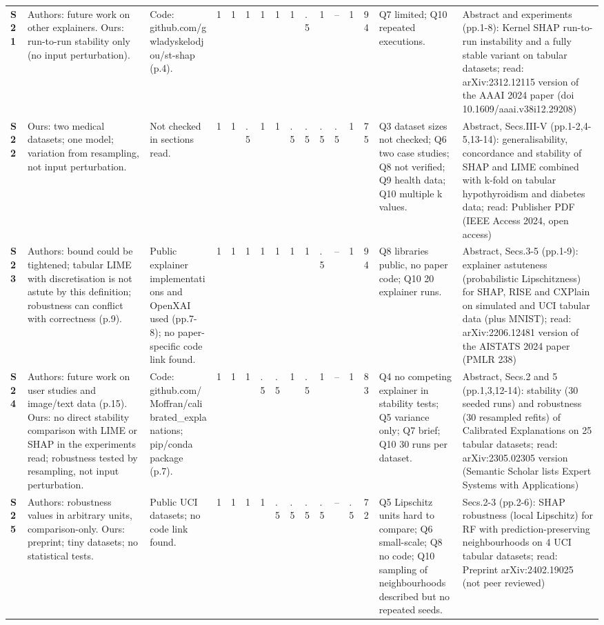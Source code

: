 \begin{longtable}{@{}P{1.0cm}P{4.6cm}P{3.6cm}P{0.3cm}P{0.3cm}P{0.3cm}P{0.3cm}P{0.3cm}P{0.3cm}P{0.3cm}P{0.3cm}P{0.3cm}P{0.36cm}P{0.75cm}P{3.0cm}P{3.9cm}@{}}
\textbf{S21} & Authors: future work on other explainers. Ours: run-to-run stability only (no input perturbation). & Code: github.com/\allowbreak{}gwladyskelodjou/\allowbreak{}st-shap (p.4). & 1 & 1 & 1 & 1 & 1 & 1 & .5 & 1 & -- & 1 & 94 & Q7 limited; Q10 repeated executions. & Abstract and experiments (pp.1-8): Kernel SHAP run-to-run instability and a fully stable variant on tabular datasets; read: arXiv:2312.12115 version of the AAAI 2024 paper (doi 10.1609/\allowbreak{}aaai.v38i12.29208) \\
\textbf{S22} & Ours: two medical datasets; one model; variation from resampling, not input perturbation. & Not checked in sections read. & 1 & 1 & .5 & 1 & 1 & .5 & .5 & .5 & .5 & 1 & 75 & Q3 dataset sizes not checked; Q6 two case studies; Q8 not verified; Q9 health data; Q10 multiple k values. & Abstract, Secs.III-V (pp.1-2,4-5,13-14): generalisability, concordance and stability of SHAP and LIME combined with k-fold on tabular hypothyroidism and diabetes data; read: Publisher PDF (IEEE Access 2024, open access) \\
\textbf{S23} & Authors: bound could be tightened; tabular LIME with discretisation is not astute by this definition; robustness can conflict with correctness (p.9). & Public explainer implementations and OpenXAI used (pp.7-8); no paper-specific code link found. & 1 & 1 & 1 & 1 & 1 & 1 & 1 & .5 & -- & 1 & 94 & Q8 libraries public, no paper code; Q10 20 explainer runs. & Abstract, Secs.3-5 (pp.1-9): explainer astuteness (probabilistic Lipschitzness) for SHAP, RISE and CXPlain on simulated and UCI tabular data (plus MNIST); read: arXiv:2206.12481 version of the AISTATS 2024 paper (PMLR 238) \\
\textbf{S24} & Authors: future work on user studies and image/\allowbreak{}text data (p.15). Ours: no direct stability comparison with LIME or SHAP in the experiments read; robustness tested by resampling, not input perturbation. & Code: github.com/\allowbreak{}Moffran/\allowbreak{}calibrated\_\allowbreak{}explanations; pip/\allowbreak{}conda package (p.7). & 1 & 1 & 1 & .5 & .5 & 1 & .5 & 1 & -- & 1 & 83 & Q4 no competing explainer in stability tests; Q5 variance only; Q7 brief; Q10 30 runs per dataset. & Abstract, Secs.2 and 5 (pp.1,3,12-14): stability (30 seeded runs) and robustness (30 resampled refits) of Calibrated Explanations on 25 tabular datasets; read: arXiv:2305.02305 version (Semantic Scholar lists Expert Systems with Applications) \\
\textbf{S25} & Authors: robustness values in arbitrary units, comparison-only. Ours: preprint; tiny datasets; no statistical tests. & Public UCI datasets; no code link found. & 1 & 1 & 1 & 1 & .5 & .5 & .5 & .5 & -- & .5 & 72 & Q5 Lipschitz units hard to compare; Q6 small-scale; Q8 no code; Q10 sampling of neighbourhoods described but no repeated seeds. & Secs.2-3 (pp.2-6): SHAP robustness (local Lipschitz) for RF with prediction-preserving neighbourhoods on 4 UCI tabular datasets; read: Preprint arXiv:2402.19025 (not peer reviewed) \\

\end{longtable}
